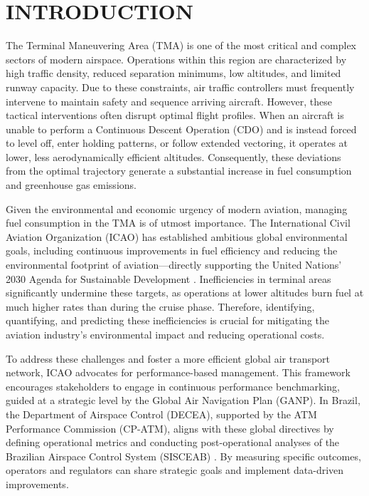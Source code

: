 \section{INTRODUCTION}
\label{sec:intro}

The Terminal Maneuvering Area (TMA) is one of the most critical and complex sectors of modern airspace. Operations within this region are characterized by high traffic density, reduced separation minimums, low altitudes, and limited runway capacity. Due to these constraints, air traffic controllers must frequently intervene to maintain safety and sequence arriving aircraft. However, these tactical interventions often disrupt optimal flight profiles. When an aircraft is unable to perform a Continuous Descent Operation (CDO) and is instead forced to level off, enter holding patterns, or follow extended vectoring, it operates at lower, less aerodynamically efficient altitudes. Consequently, these deviations from the optimal trajectory generate a substantial increase in fuel consumption and greenhouse gas emissions.

Given the environmental and economic urgency of modern aviation, managing fuel consumption in the TMA is of utmost importance. The International Civil Aviation Organization (ICAO) has established ambitious global environmental goals, including continuous improvements in fuel efficiency and reducing the environmental footprint of aviation—directly supporting the United Nations' 2030 Agenda for Sustainable Development \cite{doc9750}. Inefficiencies in terminal areas significantly undermine these targets, as operations at lower altitudes burn fuel at much higher rates than during the cruise phase. Therefore, identifying, quantifying, and predicting these inefficiencies is crucial for mitigating the aviation industry's environmental impact and reducing operational costs.

To address these challenges and foster a more efficient global air transport network, ICAO advocates for performance-based management. This framework encourages stakeholders to engage in continuous performance benchmarking, guided at a strategic level by the Global Air Navigation Plan (GANP). In Brazil, the Department of Airspace Control (DECEA), supported by the ATM Performance Commission (CP-ATM), aligns with these global directives by defining operational metrics and conducting post-operational analyses of the Brazilian Airspace Control System (SISCEAB) \cite{mca10022}. By measuring specific outcomes, operators and regulators can share strategic goals and implement data-driven improvements.

